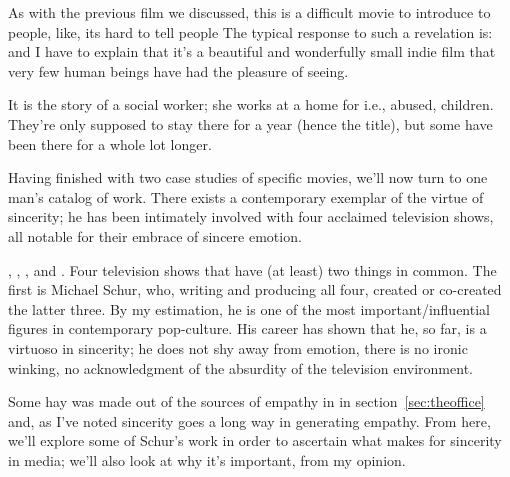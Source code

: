 \documentclass[../butidigress.tex]{subfiles}
\begin{document}
As with the previous film we discussed, this is a difficult movie to introduce to people, like, its hard to tell people 
The typical response to such a revelation is:  and I have to explain that it's a beautiful and wonderfully small indie film that very few human beings have had the pleasure of seeing.

It is the story of a social worker; she works at a home for  i.e., abused, children.
They're only supposed to stay there for a year (hence the title), but some have been there for a whole lot longer.


\entryskip

Having finished with two case studies of specific movies, we'll now turn to one man's catalog of work.
There exists a contemporary exemplar of the virtue of sincerity; he has been intimately involved with four acclaimed television shows, all notable for their embrace of sincere emotion.

, , , and .
Four television shows that have (at least) two things in common.
The first is Michael Schur, who, writing and producing all four, created or co-created the latter three.
By my estimation, he is one of the most important/influential figures in contemporary pop-culture.
His career has shown that he, so far, is a virtuoso in sincerity; he does not shy away from emotion, there is no ironic winking, no acknowledgment of the absurdity of the television environment.

Some hay was made out of the sources of empathy in  in section~\ref{sec:theoffice} and, as I've noted sincerity goes a long way in generating empathy.
From here, we'll explore some of Schur's work in order to ascertain what makes for sincerity in media; we'll also look at why it's important, from my opinion.
\end{document}
